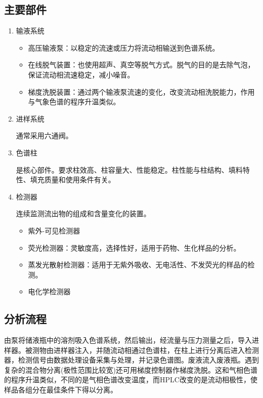 \subsection{主要部件}
\begin{enumerate}
	\item 输液系统
	\begin{itemize}
		\item 高压输液泵：以稳定的流速或压力将流动相输送到色谱系统。
		\item 在线脱气装置：也使用超声、真空等脱气方式。脱气的目的是去除气泡，保证流动相流速稳定，减小噪音。
		\item 梯度洗脱装置：通过两个输液泵流速的变化，改变流动相洗脱能力，作用与气象色谱的程序升温类似。
	\end{itemize}
	\item 进样系统
	
	通常采用六通阀。
	\item 色谱柱
	
	是核心部件。要求柱效高、柱容量大、性能稳定。柱性能与柱结构、填料特性、填充质量和使用条件有关。
	\item 检测器
	
	连续监测流出物的组成和含量变化的装置。
	\begin{itemize}
		\item 紫外-可见检测器
		\item 荧光检测器：灵敏度高，选择性好，适用于药物、生化样品的分析。
		\item 蒸发光散射检测器：适用于无紫外吸收、无电活性、不发荧光的样品的检测。
		\item 电化学检测器
	\end{itemize}

\end{enumerate}

\subsection{分析流程}
由泵将储液瓶中的溶剂吸入色谱系统，然后输出，经流量与压力测量之后，导入进样器。被测物由进样器注入，并随流动相通过色谱柱，在柱上进行分离后进入检测器，检测信号由数据处理设备采集与处理，并记录色谱图。废液流入废液瓶。遇到复杂的混合物分离(极性范围比较宽)还可用梯度控制器作梯度洗脱。这和气相色谱的程序升温类似，不同的是气相色谱改变温度，而HPLC改变的是流动相极性，使样品各组分在最佳条件下得以分离。


